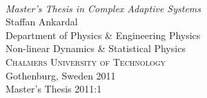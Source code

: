 \begin{titlepage}

\mbox{}
\vfill
\addtolength{\voffset}{2cm}
\begin{flushleft}
	{ \\[0.5cm]
	\emph{\Large Master's Thesis in Complex Adaptive Systems} \\[.8cm]
	
	{\huge Staffan Ankardal}\\[.8cm]
	
	{\Large Department of Physics \& Engineering Physics \\
	Non-linear Dynamics \& Statistical Physics \\
	\textsc{Chalmers University of Technology} \\
	Gothenburg, Sweden 2011 \\
	Master's Thesis 2011:1\\
	} 
	}
\end{flushleft}

\end{titlepage}
\ClearShipoutPicture

